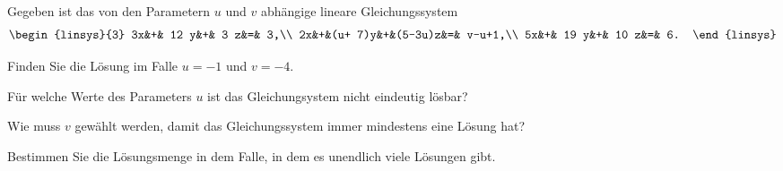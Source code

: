 Gegeben ist das von den Parametern $u$ und $v$ abhängige lineare
Gleichungssystem
\[
\begin{linsys}{3}
3x&+&   12 y&+& 3    z&=&     3,\\
2x&+&(u+ 7)y&+&(5-3u)z&=& v-u+1,\\
5x&+&   19 y&+& 10    z&=&    6.
\end{linsys}
\]
\begin{teilaufgaben}
\item
Finden Sie die Lösung im Falle $u=-1$ und $v=-4$.
\item
Für welche Werte des Parameters $u$ ist das Gleichungsystem nicht eindeutig
lösbar?
\item
Wie muss $v$ gewählt werden, damit das Gleichungssystem immer mindestens
eine Lösung hat?
\item
Bestimmen Sie die Lösungsmenge in dem Falle, in dem es unendlich viele
Lösungen gibt.
\end{teilaufgaben}


